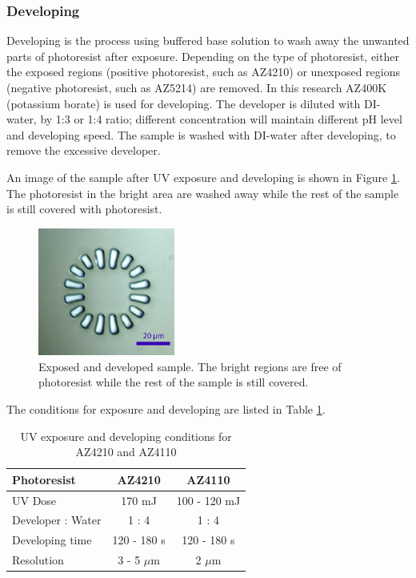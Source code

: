 \documentclass[pdflatex, sectionletters, 12pt]{pittetd}    %
\begin{document}
\subsubsection{Developing}

Developing is the process using buffered base solution to wash away the unwanted parts of photoresist after exposure. Depending on the type of photoresist, either the exposed regions (positive photoresist, such as AZ4210) or unexposed regions (negative photoresist, such as AZ5214) are removed. In this research AZ400K (potassium borate) is used for developing. The developer is diluted with DI-water, by 1:3 or 1:4 ratio; different concentration will maintain different pH level and developing speed. The sample is washed with DI-water after developing, to remove the excessive developer. 

An image of the sample after UV exposure and developing is shown in Figure \ref{FIG:Developed}. The photoresist in the bright area are washed away while the rest of the sample is still covered with photoresist.
\\

\begin{figure}[h!]
	\centering
	\includegraphics[width=0.4\textwidth]{Drawing/Developed.png}
	\caption{Exposed and developed sample. The bright regions are free of photoresist while the rest of the sample is still covered.}
	\label{FIG:Developed}
\end{figure}

The conditions for exposure and developing are listed in Table \ref{TAB:photoresistsExposureDeveloping}.

\begin{table}[h!]
	\centering
	\begin{tabular}{l|cc}
		\hline
		Photoresist    &    AZ4210    &    AZ4110 \\ \hline
		UV Dose    &    170 mJ    & 100 - 120 mJ    \\ 
		Developer : Water    &    1 : 4    &    1 : 4    \\
		Developing time    &    120 - 180 s    &    120 - 180 s \\ 
		Resolution    &    3 - 5 $\mu$m    &    2 $\mu$m    \\ \hline
	\end{tabular}
	\caption{UV exposure and developing conditions for AZ4210 and AZ4110}
	\label{TAB:photoresistsExposureDeveloping}    
\end{table}
\end{document}
